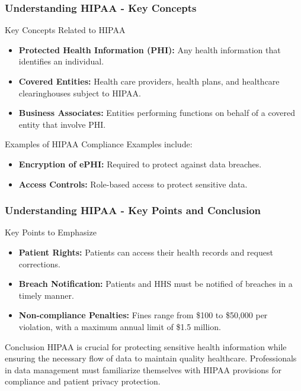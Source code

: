 \documentclass[aspectratio=169]{beamer}
\begin{document}
\begin{frame}[fragile]
    \frametitle{Understanding HIPAA - Key Concepts}
    \begin{block}{Key Concepts Related to HIPAA}
        \begin{itemize}
            \item \textbf{Protected Health Information (PHI):} Any health information that identifies an individual.
            \item \textbf{Covered Entities:} Health care providers, health plans, and healthcare clearinghouses subject to HIPAA.
            \item \textbf{Business Associates:} Entities performing functions on behalf of a covered entity that involve PHI.
        \end{itemize}
    \end{block}

    \begin{block}{Examples of HIPAA Compliance}
        Examples include:
        \begin{itemize}
            \item \textbf{Encryption of ePHI:} Required to protect against data breaches.
            \item \textbf{Access Controls:} Role-based access to protect sensitive data.
        \end{itemize}
    \end{block}
\end{frame}

\begin{frame}[fragile]
    \frametitle{Understanding HIPAA - Key Points and Conclusion}
    \begin{block}{Key Points to Emphasize}
        \begin{itemize}
            \item \textbf{Patient Rights:} Patients can access their health records and request corrections.
            \item \textbf{Breach Notification:} Patients and HHS must be notified of breaches in a timely manner.
            \item \textbf{Non-compliance Penalties:} Fines range from \$100 to \$50,000 per violation, with a maximum annual limit of \$1.5 million.
        \end{itemize}
    \end{block}

    \begin{block}{Conclusion}
        HIPAA is crucial for protecting sensitive health information while ensuring the necessary flow of data to maintain quality healthcare. Professionals in data management must familiarize themselves with HIPAA provisions for compliance and patient privacy protection.
    \end{block}
\end{frame}
\end{document}
